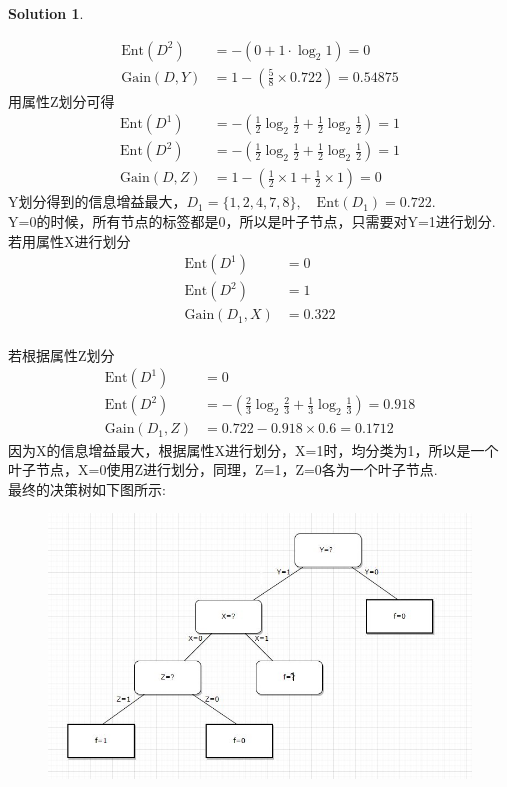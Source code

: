 \documentclass[a4paper,UTF8]{article}
\numberwithin{equation}{section}
\theoremstyle{definition}
\newtheorem*{solution}{Solution}
\begin{document}
\begin{solution}
\begin{enumerate}
\begin{align*}
			\text{Ent}(D^2) &= -(0 + 1\cdot \log_2 1) = 0 \\
			\text{Gain}(D,Y) &= 1-\left( \frac{5}{8} \times 0.722\right) = 0.54875
		\end{align*}
		用属性Z划分可得
		\begin{align*}
			\text{Ent}(D^1) &= -\left( \frac{1}{2} \log_2 \frac{1}{2} + \frac{1}{2}\log_2 \frac{1}{2} \right) = 1 \\
			\text{Ent}(D^2) &= -\left( \frac{1}{2}\log_2 \frac{1}{2} + \frac{1}{2} \log_2 \frac{1}{2} \right) = 1 \\
			\text{Gain}(D,Z) &= 1- (\frac{1}{2}\times 1 + \frac{1}{2} \times 1) = 0
		\end{align*}
		Y划分得到的信息增益最大，$D_1 = \{1,2,4,7,8\},\quad \text{Ent}(D_1)=0.722$.\\ Y=0的时候，所有节点的标签都是0，所以是叶子节点，只需要对Y=1进行划分.
		\\若用属性X进行划分
		\begin{align*}
			\text{Ent}(D^1) &= 0 \\
			\text{Ent}(D^2) &= 1 \\
			\text{Gain}(D_1,X) &= 0.322
		\end{align*}
		\\若根据属性Z划分
		\begin{align*}
			\text{Ent}(D^1) &= 0 \\
			\text{Ent}(D^2) &= -(\frac{2}{3}\log_2\frac{2}{3} + \frac{1}{3}\log_2 \frac{1}{3}) = 0.918 \\
			\text{Gain}(D_1, Z) &= 0.722-0.918\times 0.6 = 0.1712 
		\end{align*}
		因为X的信息增益最大，根据属性X进行划分，X=1时，均分类为1，所以是一个叶子节点，X=0使用Z进行划分，同理，Z=1，Z=0各为一个叶子节点.
		\\最终的决策树如下图所示:
		\begin{figure}[H]
			\centering
			\includegraphics[scale=0.5]{1.png}
			\label{figure}
		\end{figure}		
	

\end{enumerate}
\end{solution}
\end{document}
